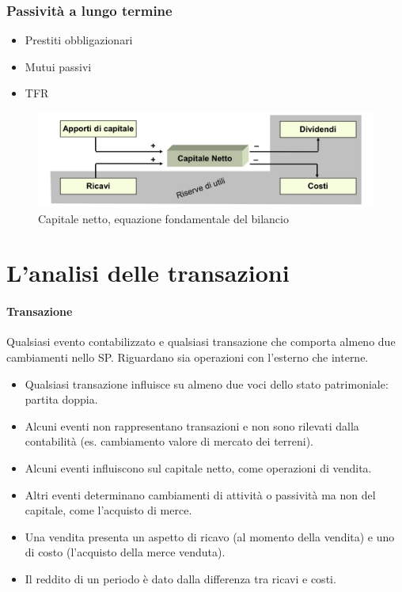 \documentclass{report}
\begin{document}
	\subsubsection{Passività a lungo termine}
	\begin{itemize}
		\item Prestiti obbligazionari
		\item Mutui passivi
		\item TFR
	\end{itemize}
	\begin{figure}[h]
		\centering
		\includegraphics[width=0.7\linewidth]{images/capitale-netto}
		\caption{Capitale netto, equazione fondamentale del bilancio}
		\label{fig:capitale-netto}
	\end{figure}
	\section{L'analisi delle transazioni}
	\paragraph{Transazione} Qualsiasi evento contabilizzato e qualsiasi transazione che comporta almeno due cambiamenti nello SP. Riguardano sia operazioni con l'esterno che interne.
	\medskip \\
	\begin{itemize}
		\item Qualsiasi transazione influisce su almeno due voci dello stato patrimoniale: partita doppia.
		\item Alcuni eventi non rappresentano transazioni e non sono rilevati dalla contabilità (es. cambiamento valore di mercato dei terreni).
		\item Alcuni eventi influiscono sul capitale netto, come operazioni di vendita.
		\item Altri eventi determinano cambiamenti di attività o passività ma non del capitale, come l'acquisto di merce.
		\item Una vendita presenta un aspetto di ricavo (al momento della vendita) e uno di costo (l'acquisto della merce venduta).
		\item Il reddito di un periodo è dato dalla differenza tra ricavi e costi.
	\end{itemize}
\end{document}
